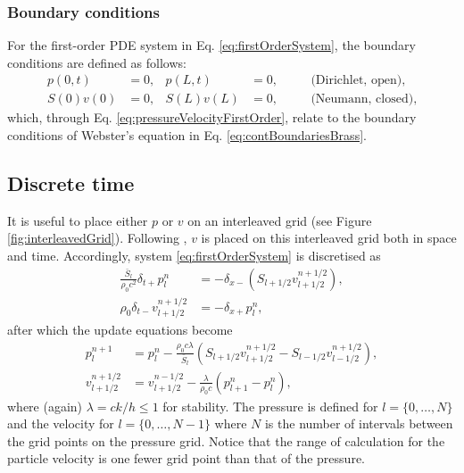 {\subsubsection{Boundary conditions}
For the first-order PDE system in Eq. \eqref{eq:firstOrderSystem}, the boundary conditions are defined as follows:
\begin{subequations}
    \begin{align}\label{eq:firstOrderBoundaryConditionsCont}
        p(0,t) &= 0, &  p(L,t) &= 0, & &\quad\text{(Dirichlet, open)},\\
        S(0)v(0) &= 0, & S(L)v(L) &= 0, & &\quad \text{(Neumann, closed)},
    \end{align}
\end{subequations}
which, through Eq. \eqref{eq:pressureVelocityFirstOrder}, relate to the boundary conditions of Webster's equation in Eq. \eqref{eq:contBoundariesBrass}.

\subsection{Discrete time}
It is useful to place either $p$ or $v$ on an interleaved grid (see Figure \ref{fig:interleavedGrid}). Following \cite{Harrison2018}, $v$ is placed on this interleaved grid both in space and time. 
Accordingly, system \eqref{eq:firstOrderSystem} is discretised as
\begin{subequations}\label{eq:firstOrderFDS}
    \begin{align}
        \frac{\bar S_l}{\rho_0 c^2}\delta_{t+}p_l^n &= -\delta_{x-}(S_{l+1/2}v_{l+1/2}^{n+1/2}),\label{eq:discPressure}\\
        \rho_0 \delta_{t-}v_{l+1/2}^{n+1/2}&=-\delta_{x+}p_l^n,\label{eq:discVelocity}
    \end{align}
\end{subequations}
after which the update equations become
\begin{subequations}
    \begin{align}
        p_l^{n+1} &= p_l^n - \frac{\rho_0 c \lambda}{\bar{S}_l}(S_{l+1/2}v_{l+1/2}^{n+1/2}-S_{l-1/2}v_{l-1/2}^{n+1/2}),\label{eq:pressureUpdate}\\
        v_{l+1/2}^{n+1/2} &= v_{l+1/2}^{n-1/2}-\frac{\lambda}{\rho_0 c}(p_{l+1}^n - p_l^n),\label{eq:velocityUpdate}
    \end{align}
\end{subequations}
where (again) $\lambda = ck/h \leq 1$ for stability. The pressure is defined for $l=\{0, \hdots, N\}$ and the velocity for $l=\{0, \hdots, N-1\}$ where $N$ is the number of intervals between the grid points on the pressure grid. Notice that the range of calculation for the particle velocity is one fewer grid point than that of the pressure.

}
